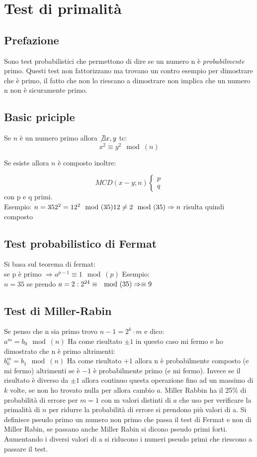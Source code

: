 \documentclass[10pt,a4paper]{article}
\begin{document}
\section{Test di primalità}
\subsection{Prefazione}
Sono test probabilistici che permettono di dire se un numero n è \textit{probabilmente} primo. Questi test non fattorizzano ma trovano un contro esempio per dimostrare che è primo, il fatto che non lo riescano a dimostrare non implica che un numero n non è sicuramente primo.

\subsection{Basic priciple}
Se $n$ è un numero primo allora $\not \exists x,y$ tc:
$$x^2\equiv y^2 \mod(n)$$

Se esiste allora $n$ è composto inoltre:

$$MCD(x-y;n)
\begin{cases}
p\\q
\end{cases}
$$
con p e q primi.\\
Esempio:
$n=35\\
2^2=12^2 \mod(35)\\
12 \not = 2 \mod(35) \Rightarrow n$ risulta quindi composto\\

\subsection{Test probabilistico di Fermat}
Si basa sul teorema di fermat:\\
se p è primo $\Rightarrow a^{p-1}\equiv 1 \mod(p)$
Esempio:\\
$n=35$ se prendo $a=2:\\
2^{24}\equiv \mod(35) \Rightarrow \equiv 9
$
\subsection{Test di Miller-Rabin}
Se penso che n sia primo trovo $n-1=2^k\cdot m$ e dico:\\
$a^m=b_0 \mod(n)$ Ha come risultato $ \pm 1$ in questo caso mi fermo e ho dimostrato che n è primo altrimenti:\\
$b_0^m=b_1 \mod(n)$ Ha come risultato $+1$ allora n è probabilmente composto (e mi fermo) altrimenti se è $-1$ è probabilmente primo (e mi fermo). Invece se il risultato è diverso da $\pm 1$ allora continuo questa operazione fino ad un massimo di $k$ volte, se non ho trovato nulla per allora cambio $a$. Miller Rabbin ha il 25\% di probabilità di errore per $m=1$ con m valori distinti di $a$ che uso per verificare la primalità di $n$ per ridurre la probabilità di errore si prendono più valori di a. Si definisce pseudo primo un numero non primo che passa il test di Fermat e non di Miller Rabin, se passano anche Miller Rabin si dicono pseudo primi forti. Aumentando i diversi valori di a si riducono i numeri pseudo primi che riescono a passare il test.
\end{document}
